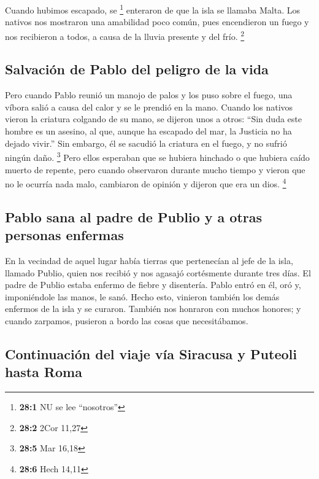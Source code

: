 \begin{paracol}{2}
 Cuando hubimos escapado, se \footnote{\textbf{28:1} NU se
  lee ``nosotros''} enteraron de que la isla se llamaba Malta.
 Los nativos nos mostraron una amabilidad poco común, pues
encendieron un fuego y nos recibieron a todos, a causa de la lluvia
presente y del frío. \footnote{\textbf{28:2} 2Cor 11,27}

\hypertarget{salvaciuxf3n-de-pablo-del-peligro-de-la-vida}{%
\subsection{Salvación de Pablo del peligro de la
vida}\label{salvaciuxf3n-de-pablo-del-peligro-de-la-vida}}

 Pero cuando Pablo reunió un manojo de palos y los puso
sobre el fuego, una víbora salió a causa del calor y se le prendió en la
mano.  Cuando los nativos vieron la criatura colgando de
su mano, se dijeron unos a otros: ``Sin duda este hombre es un asesino,
al que, aunque ha escapado del mar, la Justicia no ha dejado vivir.''
 Sin embargo, él se sacudió la criatura en el fuego, y no
sufrió ningún daño. \footnote{\textbf{28:5} Mar 16,18} 
Pero ellos esperaban que se hubiera hinchado o que hubiera caído muerto
de repente, pero cuando observaron durante mucho tiempo y vieron que no
le ocurría nada malo, cambiaron de opinión y dijeron que era un dios.
\footnote{\textbf{28:6} Hech 14,11}

\hypertarget{pablo-sana-al-padre-de-publio-y-a-otras-personas-enfermas}{%
\subsection{Pablo sana al padre de Publio y a otras personas
enfermas}\label{pablo-sana-al-padre-de-publio-y-a-otras-personas-enfermas}}

 En la vecindad de aquel lugar había tierras que
pertenecían al jefe de la isla, llamado Publio, quien nos recibió y nos
agasajó cortésmente durante tres días.  El padre de Publio
estaba enfermo de fiebre y disentería. Pablo entró en él, oró y,
imponiéndole las manos, le sanó.  Hecho esto, vinieron
también los demás enfermos de la isla y se curaron. 
También nos honraron con muchos honores; y cuando zarpamos, pusieron a
bordo las cosas que necesitábamos.

\hypertarget{continuaciuxf3n-del-viaje-vuxeda-siracusa-y-puteoli-hasta-roma}{%
\subsection{Continuación del viaje vía Siracusa y Puteoli hasta
Roma}\label{continuaciuxf3n-del-viaje-vuxeda-siracusa-y-puteoli-hasta-roma}}


\end{paracol}
